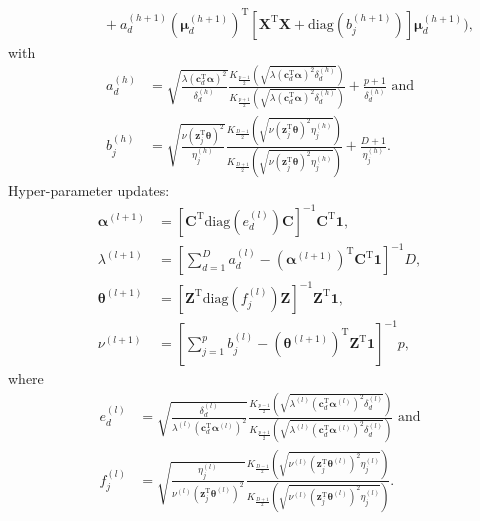 \documentclass[a4paper,hidelinks]{article}\usepackage[]{graphicx}\usepackage[]{color}
\newcommand{\X}{\mathbf{X}}
\newcommand{\0}{\bm{0}}
\newcommand{\tr}{^{\text{T}}}
\newcommand{\diag}{\text{diag}}
\renewcommand{\(}{\left(}
\renewcommand{\)}{\right)}
\renewcommand{\[}{\left[}
\renewcommand{\]}{\right]}
\begin{document}
\begin{appendix}
\begin{align*}
		& \,\,\,\,\,\,\,\,\,\,\,\,\,\,\,\,\,\,\,\, + a_d^{(h+1)} (\bm{\mu}_d^{(h+1)}) \tr \[\X \tr \X + \diag(b_j^{(h + 1)})\]\bm{\mu}_d^{(h+1)}\Big),
		\end{align*}
		with
		\begin{align*}
		a_d^{(h)} & = \sqrt{\frac{\lambda (\mathbf{c}_d \tr \bm{\alpha})^2}{\delta_d^{(h)}}} \frac{K_{\frac{p-1}{2}} \( \sqrt{\lambda (\mathbf{c}_d \tr \bm{\alpha})^2 \delta_d^{(h)}} \)}{K_{\frac{p+1}{2}} \( \sqrt{\lambda (\mathbf{c}_d \tr \bm{\alpha})^2 \delta_d^{(h)}} \)} + \frac{p+1}{\delta_d^{(h)}} \text{ and} \\
		b_j^{(h)} & = \sqrt{\frac{\nu (\mathbf{z}_j \tr \bm{\theta})^2}{\eta_j^{(h)}}} \frac{K_{\frac{D-1}{2}} \( \sqrt{\nu (\mathbf{z}_j \tr \bm{\theta})^2 \eta_j^{(h)}} \)}{K_{\frac{D+1}{2}} \( \sqrt{\nu (\mathbf{z}_j \tr \bm{\theta})^2 \eta_j^{(h)}} \)} + \frac{D+1}{\eta_j^{(h)}}.
		\end{align*}
		Hyper-parameter updates:
		\begin{align*}
		\bm{\alpha}^{(l+1)} & = \left[ \mathbf{C} \tr \diag ( e_d^{(l)} ) \mathbf{C} \right]^{-1} \mathbf{C} \tr \mathbf{1}, \\
		\lambda^{(l+1)} & = \[ \sum_{d=1}^D a_d^{(l)} - (\bm{\alpha}^{(l+1)}) \tr \mathbf{C} \tr \mathbf{1} \]^{-1} D, \\
		\bm{\theta}^{(l+1)} & = \left[ \mathbf{Z} \tr \diag ( f_j^{(l)} ) \mathbf{Z} \right]^{-1} \mathbf{Z} \tr \mathbf{1}, \\
		\nu^{(l+1)} & = \[ \sum_{j=1}^p b_j^{(l)} - (\bm{\theta}^{(l+1)}) \tr \mathbf{Z} \tr \mathbf{1} \]^{-1} p,
		\end{align*}
		where 
		\begin{align*}
		e_d^{(l)} & = \sqrt{\frac{\delta_d^{(l)}}{\lambda^{(l)}(\mathbf{c}_d \tr \bm{\alpha}^{(l)})^2}} \frac{K_{\frac{p - 1}{2}} \( \sqrt{\lambda^{(l)} (\mathbf{c}_d \tr \bm{\alpha}^{(l)})^2 \delta_d^{(l)}} \)}{K_{\frac{p + 1}{2}} \( \sqrt{\lambda^{(l)} (\mathbf{c}_d \tr \bm{\alpha}^{(l)})^2 \delta_d^{(l)}} \)} \text{ and} \\
		f_j^{(l)} & = \sqrt{\frac{\eta_j^{(l)}}{\nu^{(l)}(\mathbf{z}_j \tr \bm{\theta}^{(l)})^2}} \frac{K_{\frac{D - 1}{2}} \( \sqrt{\nu^{(l)} (\mathbf{z}_j \tr \bm{\theta}^{(l)})^2 \eta_j^{(l)}} \)}{K_{\frac{D + 1}{2}} \( \sqrt{\nu^{(l)} (\mathbf{z}_j \tr \bm{\theta}^{(l)})^2 \eta_j^{(l)}} \)}.
		\end{align*}
	
	\end{appendix}
\end{document}
